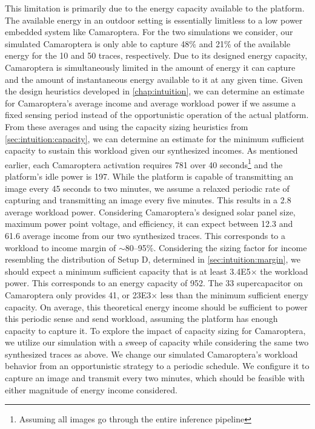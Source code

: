 This limitation is primarily due to the energy capacity available to the platform. The available energy in an outdoor setting is essentially limitless to a low power embedded system like Camaroptera. For the two simulations we consider, our simulated Camaroptera is only able to capture 48\% and 21\% of the available energy for the 10 and 50\ssi[per-mode=symbol]{\milli\watt\per\centi\meter\squared} traces, respectively. 
Due to its designed energy capacity, Camaroptera is simultaneously limited in the amount of energy it can capture and the amount of instantaneous energy available to it at any given time.
Given the design heuristics developed in \cref{chap:intuition}, we can determine an estimate for Camaroptera's average income and average workload power if we assume a fixed sensing period instead of the opportunistic operation of the actual platform.
From these averages and using the capacity sizing heuristics from \cref{sec:intuition:capacity}, we can determine an estimate for the minimum sufficient capacity to sustain this workload given our synthesized incomes.
As mentioned earlier, each Camaroptera activation requires 781\ssi{\milli\joule} over 40 seconds\footnote{Assuming all images go through the entire inference pipeline} and the platform's idle power is 197\ssi{\micro\watt}.
While the platform is capable of transmitting an image every 45 seconds to two minutes, we assume a relaxed periodic rate of capturing and transmitting an image every five minutes.
This results in a 2.8\ssi{\milli\watt} average workload power.
Considering Camaroptera's designed solar panel size, maximum power point voltage, and efficiency, it can expect between 12.3 and 61.6\ssi{\milli\watt} average income from our two synthesized traces.
This corresponds to a workload to income margin of $\sim$80--95\%. Considering the sizing factor for income resembling the distribution of Setup D, determined in \cref{sec:intuition:margin}, we should expect a minimum sufficient capacity that is at least \num{3.4E5}$\times$ the workload power. 
This corresponds to an energy capacity of 952\ssi{\milli\Wh}. The 33\ssi{\milli\farad} supercapacitor on Camaroptera only provides 41\ssi{\micro\watt\hour}, or \num{23E3}$\times$ less than the minimum sufficient energy capacity.
On average, this theoretical energy income should be sufficient to power this periodic sense and send workload, assuming the platform has enough capacity to capture it.
To explore the impact of capacity sizing for Camaroptera, we utilize our simulation with a sweep of capacity while considering the same two synthesized traces as above. 
We change our simulated Camaroptera's workload behavior from an opportunistic strategy to a periodic schedule.
We configure it to capture an image and transmit every two minutes, which should be feasible with either magnitude of energy income considered.

